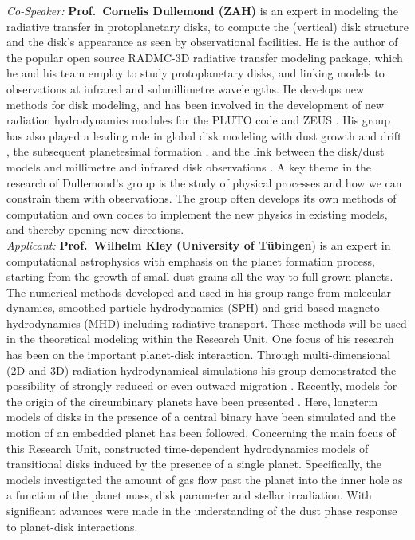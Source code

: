 \documentclass[10pt,fleqn,twoside,a4paper]{article}
\begin{document}
{\it Co-Speaker:} {\bf Prof.\ Cornelis Dullemond (ZAH)} is an expert in modeling the radiative transfer in protoplanetary
disks, to compute the (vertical) disk structure and the disk's appearance as seen
by observational facilities. He is the author of the popular open source RADMC-3D 
radiative transfer modeling package, which he and his team employ to study
protoplanetary disks, and linking models to observations at infrared and submillimetre
wavelengths. He develops new methods for disk modeling, and has been involved
in the development of new radiation hydrodynamics modules for the PLUTO code
\citep{2010A&A...511A..81K} and ZEUS \citep{2015A&A...574A..81R}. His group has also played a
leading role in global disk modeling with dust growth and drift 
\citep[e.g.,][]{2008A&A...480..859B, 2008A&A...489..931Z, 2010A&A...513A..56G,
2010A&A...513A..57Z, 2009A&A...503L...5B, 2010A&A...513A..79B}, 
the subsequent planetesimal formation 
\citep[e.g.,][]{2010Icar..210..507O, 2012A&A...544L..16W, 2014A&A...572A..78D}, 
and the link between the disk/dust models and millimetre
and infrared disk observations 
\citep[e.g.,][]{2012A&A...538A.114P, 2013Sci...340.1199V,
2016ApJ...820...54K, 2016ApJ...831L..12K}. 
A key theme in the research of Dullemond's group is the study 
of physical processes and how we can constrain them with observations. The
group often develops its own methods of computation and own codes to implement
the new physics in existing models, and thereby opening new
directions. \\

{\it Applicant:} {\bf Prof.\ Wilhelm Kley (University of T\"ubingen}) is an expert in computational astrophysics with emphasis on the
planet formation process, starting from the growth of small dust grains all the way
to full grown planets. The numerical methods developed and used in his group range 
from molecular dynamics, smoothed particle hydrodynamics (SPH) and grid-based 
magneto-hydrodynamics (MHD) including radiative transport. These methods will be used
in the theoretical modeling within the Research Unit.   
One focus of his research has been on the important planet-disk
interaction. Through multi-dimensional (2D and 3D) radiation hydrodynamical simulations
his group demonstrated the possibility of strongly reduced or even outward migration
\citep{2008A&A...487L...9K, 2009A&A...506..971K}. Recently, models for the origin of the
circumbinary planets have been presented \citep{2014A&A...564A..72K}. Here, longterm models of
disks in the presence of a central binary have been simulated and the motion of an embedded
planet has been followed. Concerning the main focus of this Research Unit, 
\citet{2013A&A...560A..40M} constructed time-dependent hydrodynamics models of transitional disks induced by the
presence of a single planet. Specifically, the models investigated the amount of gas flow past
the planet into the inner hole as a function of the planet mass, disk
parameter and stellar irradiation. With \citet{2015A&A...584A.110P}
significant advances were made in the understanding of the dust phase
response to planet-disk interactions. \\
\end{document}
